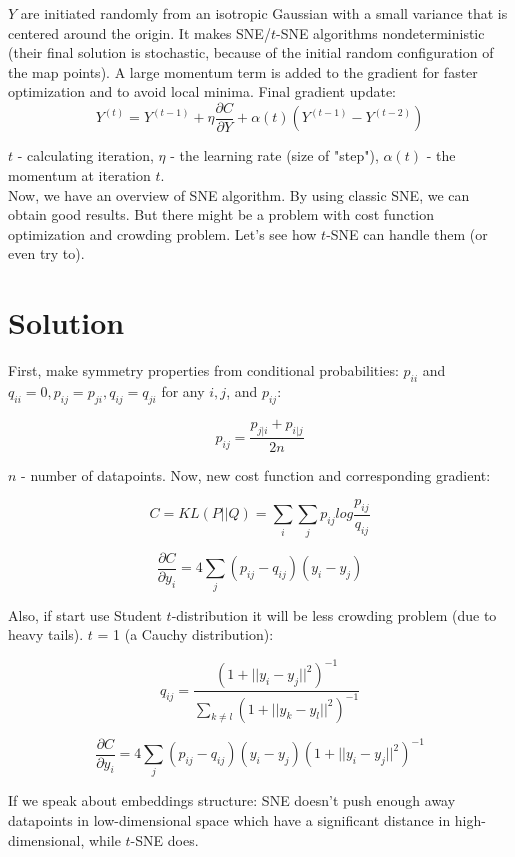 $Y$ are initiated randomly from an isotropic Gaussian with a small variance that is centered around the origin. It makes SNE/$t$-SNE algorithms nondeterministic (their final solution is stochastic, because of the initial random configuration of the map points). A large momentum term is added to the gradient for faster optimization and to avoid local minima. Final gradient update:\\

$$ Y^{(t)} = Y^{(t-1)} + \eta \frac{\partial C}{\partial Y} + \alpha(t)(Y^{(t-1)} - Y^{(t-2)})$$

$t$ - calculating iteration, $\eta$ - the learning rate (size of "step"), $\alpha(t)$ - the momentum at iteration $t$.\\

Now, we have an overview of SNE algorithm. By using classic SNE, we can obtain good results. But there might be a problem with cost function optimization and crowding problem. Let's see how $t$-SNE can handle them (or even try to).

\section{Solution}
First, make symmetry properties from conditional probabilities: $p_{ii}$ and $q_{ii} = 0, p_{ij} = p_{ji}, q_{ij} = q_{ji}$ for any $i, j$, and $p_{ij}$:

$$ p_{ij} = \frac{p_{j|i} + p_{i|j}}{2n} $$

$n$ - number of datapoints. Now, new cost function and corresponding gradient:

$$ C = KL(P||Q) = \sum_i{\sum_j{p_{ij}log{\frac{p_{ij}}{q_{ij}}}}} $$

$$ \frac{\partial C}{\partial y_i} = 4 \sum_j{(p_{ij} - q_{ij})(y_i - y_j)} $$

Also, if start use Student $t$-distribution it will be less crowding problem (due to heavy tails). $t$ = 1 (a Cauchy distribution):

\begin{equation}
    q_{ij} = \frac{(1 + ||y_i - y_j||^2)^{-1}}{\sum_{k \ne l}{(1 + ||y_k - y_l||^2)^{-1}}}
\end{equation}

\begin{equation}
    \frac{\partial C}{\partial y_i} = 4 \sum_j{(p_{ij} - q_{ij})(y_i - y_j)(1 + ||y_i - y_j||^2)^{-1}}
\end{equation}

If we speak about embeddings structure: SNE doesn't push enough away datapoints in low-dimensional space which have a significant distance in high-dimensional, while $t$-SNE does.\\

